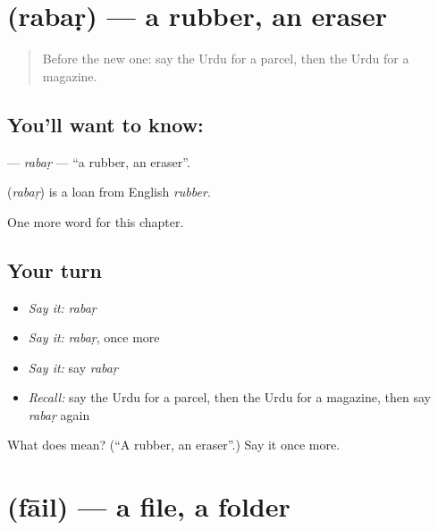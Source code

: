 \section[\texorpdfstring{\ur{ربڑ} (rabaṛ)}{ربڑ (rabaṛ)}]{ (rabaṛ) — a rubber, an eraser}

\label{lesson:UR-C225-rabar}



\begin{quote}
Before the new one: say the Urdu for a parcel, then the Urdu for a magazine.
\end{quote}

\subsection*{You'll want to know: }
\textbf{} — \emph{rabaṛ} — \textquotedblleft{}a rubber, an eraser\textquotedblright{}.

\begin{cousinweb}
\textbf{} (\emph{rabaṛ}) is a loan from English \emph{rubber}.
\end{cousinweb}

\begin{grammarlens}[title={What you've built}]
One more word for this chapter.
\end{grammarlens}

\subsection*{Your turn}
\begin{itemize}
\raggedright
  \item \emph{Say it:} \emph{rabaṛ}
  \item \emph{Say it:} \emph{rabaṛ}, once more
  \item \emph{Say it:} say \emph{rabaṛ}
  \item \emph{Recall:} say the Urdu for a parcel, then the Urdu for a magazine, then say \emph{rabaṛ} again
\end{itemize}

\begin{tcolorbox}[breakable,colback=teal!4,colframe=teal!35!black,title={Before you move on}]
What does  mean? (\textquotedblleft{}A rubber, an eraser\textquotedblright{}.) Say it once more.
\end{tcolorbox}
\section[\texorpdfstring{\ur{فائل} (fāil)}{فائل (fāil)}]{ (fāil) — a file, a folder}

